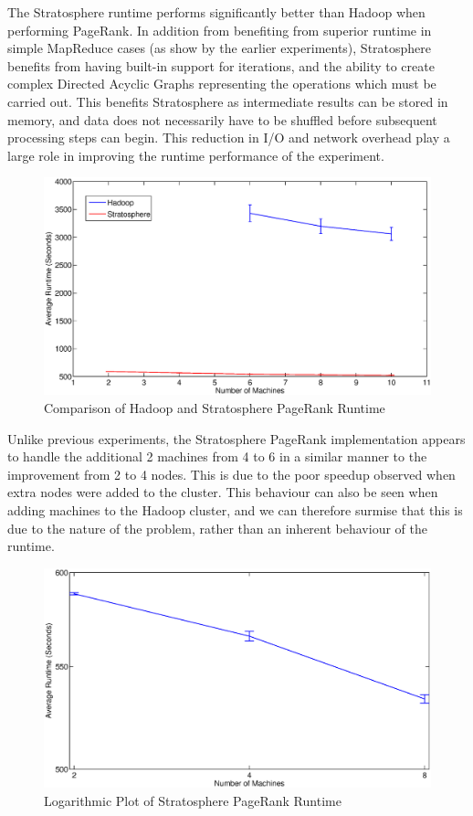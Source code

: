 The Stratosphere runtime performs significantly better than Hadoop when performing PageRank. In addition from benefiting from superior runtime in simple MapReduce cases (as show by the earlier experiments), Stratosphere benefits from having built-in support for iterations, and the ability to create complex Directed Acyclic Graphs representing the operations which must be carried out. This benefits Stratosphere as intermediate results can be stored in memory, and data does not necessarily have to be shuffled before subsequent processing steps can begin. This reduction in I/O and network overhead play a large role in improving the runtime performance of the experiment.

\begin{figure}[H]
	\centering
	\includegraphics[scale=0.6]{resources/HadoopVStratPR.eps}
	\caption{Comparison of Hadoop and Stratosphere PageRank Runtime}
	\label{hadoopvstratpr}
\end{figure}

Unlike previous experiments, the Stratosphere PageRank implementation appears to handle the additional 2 machines from 4 to 6 in a similar manner to the improvement from 2 to 4 nodes. This is due to the poor speedup observed when extra nodes were added to the cluster. This behaviour can also be seen when adding machines to the Hadoop cluster, and we can therefore surmise that this is due to the nature of the problem, rather than an inherent behaviour of the runtime. 

\begin{figure}[H]
	\centering
	\includegraphics[scale=0.6]{resources/StratPRScalability.eps}
	\caption{Logarithmic Plot of Stratosphere PageRank Runtime}
\end{figure}

